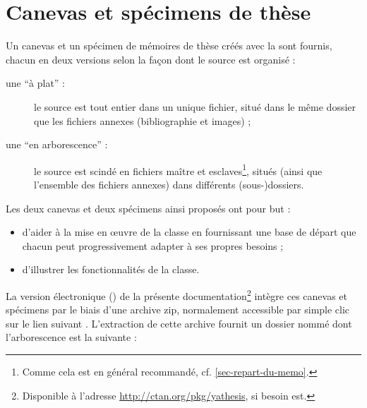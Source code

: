 \chapter{Canevas et spécimens de thèse}\label{cha-canevas-specimen}%

Un canevas et un spécimen de mémoires de thèse créés avec la \yatcl sont
fournis, chacun en deux versions selon la façon dont le source  est
organisé :
\begin{description}
\item[une \enquote{à plat} :] le source est tout entier dans un unique fichier,
  situé dans le même dossier que les fichiers annexes (bibliographie et
  images) ;
\item[une \enquote{en arborescence} :] le source est scindé en fichiers maître
  et esclaves\footnote{Comme cela est en général recommandé,
    cf. \vref{sec-repart-du-memo}.}, situés (ainsi que l'ensemble des fichiers
  annexes) dans différents (sous-)dossiers.
\end{description}
Les deux canevas et deux spécimens ainsi proposés ont pour but :
\begin{itemize}
\item d'aider à la mise en œuvre de la classe en fournissant une base de départ
  que chacun peut progressivement adapter à ses propres
  besoins ;
\item d'illustrer les fonctionnalités de la classe.
\end{itemize}

La version électronique (\pdf{}) de la présente
documentation\footnote{Disponible à l'adresse
  \url{http://ctan.org/pkg/yathesis}, si besoin est.} intègre ces canevas et
spécimens par le biais d'une archive \gls{zip}, normalement accessible par
simple clic sur le lien suivant
. L'extraction
de cette archive fournit un dossier nommé  dont l'arborescence
est la suivante :

\setlength{\DTbaselineskip}{15pt}
\begin{tcolorbox}
\end{tcolorbox}

